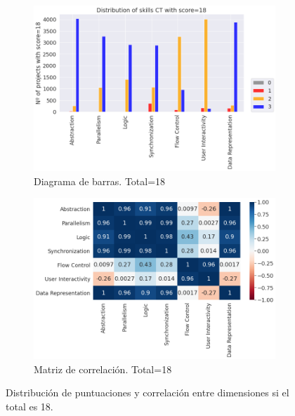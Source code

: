 \documentclass[a4paper, 12pt]{book}
\begin{document}
\begin{figure}[H]
    \centering
    \begin{subfigure}[h]{.49\textwidth} 
        \includegraphics[width=\textwidth]{img/distribucion_18_Scratch}
        \caption{Diagrama de barras. Total=18}
        \label{fig:total18}
    \end{subfigure}       
    \begin{subfigure}[h]{.49\textwidth} 
        \includegraphics[width=\textwidth]{img/corr_18_Scratch}
        \caption{Matriz de correlación. Total=18}
        \label{fig:corr18}
    \end{subfigure}
     \caption{Distribución de puntuaciones y correlación entre dimensiones si el total es 18.}
\end{figure}
\end{document}
